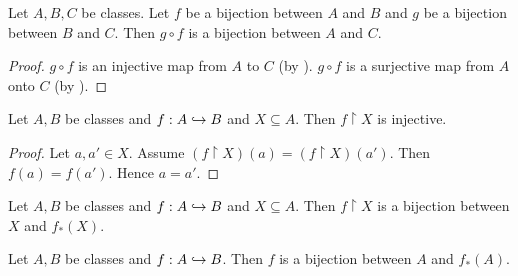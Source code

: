 \documentclass[10pt]{article}
\begin{document}
  \begin{forthel}
    \begin{corollary}
      Let $A, B, C$ be classes.
      Let $f$ be a bijection between $A$ and $B$ and $g$ be a bijection between $B$ and $C$.
      Then $g \circ f$ is a bijection between $A$ and $C$.
    \end{corollary}
    \begin{proof}
      $g \circ f$ is an injective map from $A$ to $C$ (by ).
      $g \circ f$ is a surjective map from $A$ onto $C$ (by ).
    \end{proof}
  \end{forthel}

  \begin{forthel}
    \begin{proposition}
      Let $A, B$ be classes and $f : A \hookrightarrow B$ and $X \subseteq A$.
      Then $f \restriction X$ is injective.
    \end{proposition}
    \begin{proof}
      Let $a, a' \in X$.
      Assume $(f \restriction X)(a) = (f \restriction X)(a')$.
      Then $f(a) = f(a')$.
      Hence $a = a'$.
    \end{proof}
  \end{forthel}

  \begin{forthel}
    \begin{proposition}
      Let $A, B$ be classes and $f : A \hookrightarrow B$ and $X \subseteq A$.
      Then $f \restriction X$ is a bijection between $X$ and $f_{*}(X)$.
    \end{proposition}
  \end{forthel}

  \begin{forthel}
    \begin{corollary}
      Let $A, B$ be classes and $f : A \hookrightarrow B$.
      Then $f$ is a bijection between $A$ and $f_{*}(A)$.
    \end{corollary}
  \end{forthel}
\end{document}
